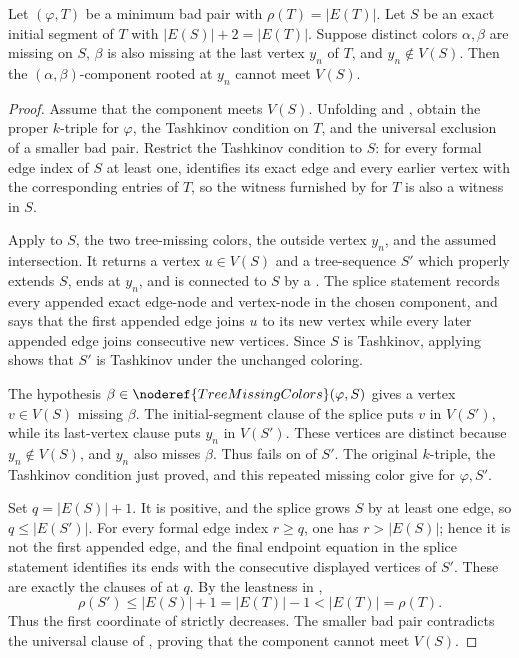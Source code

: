 \begin{helper}
Let \((\varphi,T)\) be a minimum bad pair with
\(\rho(T)=|E(T)|\).  Let \(S\) be an exact initial segment of \(T\) with
\(|E(S)|+2=|E(T)|\).  Suppose distinct colors \(\alpha,\beta\) are
missing on \(S\), \(\beta\) is also missing at the last vertex \(y_n\)
of \(T\), and \(y_n\notin V(S)\).  Then the
\((\alpha,\beta)\)-component rooted at \(y_n\) cannot meet \(V(S)\).
\end{helper}
\begin{proof}
Assume that the component meets \(V(S)\).  Unfolding
 and , obtain
the proper \(k\)-triple for \(\varphi\), the Tashkinov condition on
\(T\), and the universal exclusion of a smaller bad pair.  Restrict the
Tashkinov condition to \(S\): for every formal edge index of \(S\) at
least one,  identifies its exact
edge and every earlier vertex with the corresponding entries of \(T\),
so the witness furnished by  for \(T\) is also a
witness in \(S\).

Apply  to \(S\), the two
tree-missing colors, the outside vertex \(y_n\), and the assumed
intersection.  It returns a vertex \(u\in V(S)\) and a tree-sequence
\(S'\) which properly extends \(S\), ends at \(y_n\), and is connected
to \(S\) by a .  The splice
statement records every appended exact edge-node and vertex-node in the
chosen component, and says that the first appended edge joins \(u\) to
its new vertex while every later appended edge joins consecutive new
vertices.  Since \(S\) is Tashkinov, applying
 shows that
\(S'\) is Tashkinov under the unchanged coloring.

The hypothesis \(\beta\in\noderef{TreeMissingColors}(\varphi,S)\)
gives a vertex \(v\in V(S)\) missing \(\beta\).  The initial-segment
clause of the splice puts \(v\) in \(V(S')\), while its last-vertex
clause puts \(y_n\) in \(V(S')\).  These vertices are distinct because
\(y_n\notin V(S)\), and \(y_n\) also misses \(\beta\).  Thus
 fails on
 of \(S'\).  The original \(k\)-triple,
the Tashkinov condition just proved, and this repeated missing color give
 for \(\varphi,S'\).

Set \(q=|E(S)|+1\).  It is positive, and the splice grows \(S\) by at
least one edge, so \(q\le |E(S')|\).  For every formal edge index
\(r\ge q\), one has \(r>|E(S)|\); hence it is not the first appended
edge, and the final endpoint equation in the splice statement identifies
its ends with the consecutive displayed vertices of \(S'\).  These are
exactly the clauses of  at \(q\).  By the
leastness in ,
\[
 \rho(S')\le |E(S)|+1=|E(T)|-1<|E(T)|=\rho(T).
\]
Thus the first coordinate of  strictly
decreases.  The smaller bad pair contradicts the universal clause of
, proving that the component cannot meet
\(V(S)\).
\end{proof}
